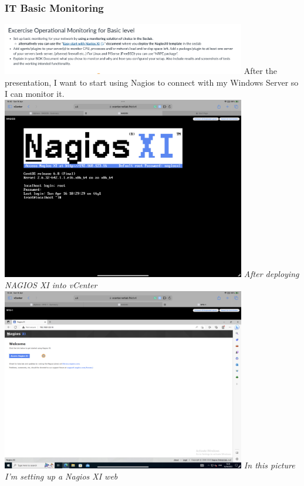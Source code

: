 \documentclass[12pt, letterpaper]{article}
\begin{document}
\subsubsection{IT Basic Monitoring}
\includegraphics[width=0.8\textwidth]{fotos/Week 8/IT Basic Monitoring/Basiclevel.jpeg}
\hfill\break
\hfill\break
After the presentation, I want to start using Nagios to connect with my Windows Server so I can monitor it.
\hfill\break
\hfill\break
\includegraphics[width=0.8\textwidth]{fotos/Week 8/IT Basic Monitoring/Fotos/Nagios deploy.png}
\break
\emph{After deploying NAGIOS XI into vCenter}
\hfill\break
\hfill\break
\includegraphics[width=0.8\textwidth]{fotos/Week 8/IT Basic Monitoring/Fotos/NAGIOs setup.png}
\break
\emph{In this picture I'm setting up a Nagios XI web}
\hfill\break
\hfill\break
\end{document}
